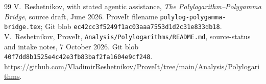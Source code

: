 \documentclass[11pt]{article}
\theoremstyle{definition}
\theoremstyle{remark}
\begin{document}
\begin{thebibliography}{99}
 V.~Reshetnikov, with stated agentic assistance, \emph{The Polylogarithm--Polygamma Bridge}, source draft, June 2026. ProveIt filename \texttt{polylog-polygamma-bridge.tex}; Git blob \texttt{ec42cc3f5249f1ac03aaa7553d1d2c31e833db18}.
 V.~Reshetnikov, ProveIt, \texttt{Analysis/Polylogarithms/README.md}, source-status and intake notes, 7 October 2026. Git blob \texttt{40f7dd8b1525e4c42e3fb83baf2fa1604e9cf248}. \url{https://github.com/VladimirReshetnikov/ProveIt/tree/main/Analysis/Polylogarithms}.
\end{thebibliography}
\end{document}
